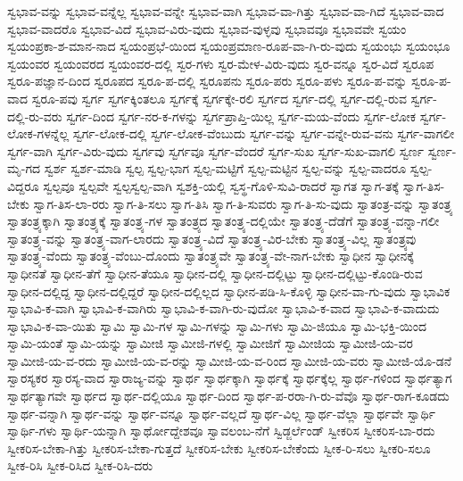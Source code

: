 {ಸ್ವಭಾವ-ವನ್ನು
ಸ್ವಭಾವ-ವನ್ನೆಲ್ಲ
ಸ್ವಭಾವ-ವನ್ನೇ
ಸ್ವಭಾವ-ವಾಗಿ
ಸ್ವಭಾವ-ವಾ-ಗಿತ್ತು
ಸ್ವಭಾವ-ವಾ-ಗಿದೆ
ಸ್ವಭಾವ-ವಾದ
ಸ್ವಭಾವ-ವಾದರೊ
ಸ್ವಭಾವ-ವಿದೆ
ಸ್ವಭಾವ-ವಿರು-ವುದು
ಸ್ವಭಾವ-ವುಳ್ಳವು
ಸ್ವಭಾವವೂ
ಸ್ವಭಾವವೇ
ಸ್ವಯಂ
ಸ್ವಯಂಪ್ರಕಾ-ಶ-ಮಾನ-ನಾದ
ಸ್ವಯಂಪ್ರಭೆ-ಯಿಂದ
ಸ್ವಯಂಪ್ರಮಾಣ-ರೂಪ-ವಾ-ಗಿ-ರು-ವುದು
ಸ್ವಯಂಭು
ಸ್ವಯಂಭೂ
ಸ್ವಯಂವರ
ಸ್ವಯಂವರದ
ಸ್ವಯಂವರ-ದಲ್ಲಿ
ಸ್ವರ-ಗಳು
ಸ್ವರ-ಮೇಳ-ವಿರು-ವುದು
ಸ್ವರ-ವನ್ನೂ
ಸ್ವರ-ವಿದೆ
ಸ್ವರೂಪ
ಸ್ವರೂ-ಪಜ್ಞಾನ-ದಿಂದ
ಸ್ವರೂಪದ
ಸ್ವರೂ-ಪ-ದಲ್ಲಿ
ಸ್ವರೂಪನು
ಸ್ವರೂ-ಪರು
ಸ್ವರೂ-ಪಳು
ಸ್ವರೂ-ಪ-ವನ್ನು
ಸ್ವರೂ-ಪ-ವಾದ
ಸ್ವರೂ-ಪವು
ಸ್ವರ್ಗ
ಸ್ವರ್ಗಕ್ಕಿಂತಲೂ
ಸ್ವರ್ಗಕ್ಕೆ
ಸ್ವರ್ಗಕ್ಕೇ-ರಲಿ
ಸ್ವರ್ಗದ
ಸ್ವರ್ಗ-ದಲ್ಲಿ
ಸ್ವರ್ಗ-ದಲ್ಲಿ-ರುವ
ಸ್ವರ್ಗ-ದಲ್ಲಿ-ರು-ವರು
ಸ್ವರ್ಗ-ದಿಂದ
ಸ್ವರ್ಗ-ನರ-ಕ-ಗಳನ್ನು
ಸ್ವರ್ಗಪ್ರಾಪ್ತಿ-ಯಿಲ್ಲ
ಸ್ವರ್ಗ-ಮಯ-ವೆಂದು
ಸ್ವರ್ಗ-ಲೋಕ
ಸ್ವರ್ಗ-ಲೋಕ-ಗಳನ್ನೆಲ್ಲ
ಸ್ವರ್ಗ-ಲೋಕ-ದಲ್ಲಿ
ಸ್ವರ್ಗ-ಲೋಕ-ವೆಂಬುದು
ಸ್ವರ್ಗ-ವನ್ನು
ಸ್ವರ್ಗ-ವನ್ನೇ-ರುವ-ವನು
ಸ್ವರ್ಗ-ವಾಗಲೀ
ಸ್ವರ್ಗ-ವಾಗಿ
ಸ್ವರ್ಗ-ವಿರು-ವುದು
ಸ್ವರ್ಗವು
ಸ್ವರ್ಗವೂ
ಸ್ವರ್ಗ-ವೆಂದರೆ
ಸ್ವರ್ಗ-ಸುಖ
ಸ್ವರ್ಗ-ಸುಖ-ವಾಗಲಿ
ಸ್ವರ್ಣ
ಸ್ವರ್ಣ-ಮೃ-ಗದ
ಸ್ವರ್ಶ
ಸ್ವರ್ಶ-ಮಾಡಿ
ಸ್ವಲ್ಪ
ಸ್ವಲ್ಪ-ಭಾಗ
ಸ್ವಲ್ಪ-ಮಟ್ಟಿಗೆ
ಸ್ವಲ್ಪ-ಮಟ್ಟಿನ
ಸ್ವಲ್ಪ-ವನ್ನು
ಸ್ವಲ್ಪ-ವಾದರೂ
ಸ್ವಲ್ಪ-ವಿದ್ದರೂ
ಸ್ವಲ್ಪವೂ
ಸ್ವಲ್ಪವೇ
ಸ್ವಲ್ಪಸ್ವಲ್ಪ-ವಾಗಿ
ಸ್ವಶಕ್ತಿ-ಯಲ್ಲಿ
ಸ್ವಸ್ಥ-ಗೊಳಿ-ಸುವಿ-ರಾದರೆ
ಸ್ವಾಗತ
ಸ್ವಾಗ-ತಕ್ಕೆ
ಸ್ವಾಗ-ತಿಸ-ಬೇಕು
ಸ್ವಾಗ-ತಿಸ-ಲಾ-ರರು
ಸ್ವಾಗ-ತಿ-ಸಲು
ಸ್ವಾಗ-ತಿಸಿ
ಸ್ವಾಗ-ತಿ-ಸುವರು
ಸ್ವಾಗ-ತಿ-ಸು-ವುದು
ಸ್ವಾತಂತ್ರ-ವನ್ನು
ಸ್ವಾತಂತ್ರ್ಯ
ಸ್ವಾತಂತ್ರ್ಯಕ್ಕಾಗಿ
ಸ್ವಾತಂತ್ರ್ಯಕ್ಕೆ
ಸ್ವಾತಂತ್ರ್ಯ-ಗಳ
ಸ್ವಾತಂತ್ರ್ಯದ
ಸ್ವಾತಂತ್ರ್ಯ-ದಲ್ಲಿಯೇ
ಸ್ವಾತಂತ್ರ್ಯ-ದೆಡೆಗೆ
ಸ್ವಾತಂತ್ರ್ಯ-ವನ್ನಾ-ಗಲೀ
ಸ್ವಾತಂತ್ರ್ಯ-ವನ್ನು
ಸ್ವಾತಂತ್ರ್ಯ-ವಾಗ-ಲಾರದು
ಸ್ವಾತಂತ್ರ್ಯ-ವಿದೆ
ಸ್ವಾತಂತ್ರ್ಯ-ವಿರ-ಬೇಕು
ಸ್ವಾತಂತ್ರ್ಯ-ವಿಲ್ಲ
ಸ್ವಾತಂತ್ರ್ಯವು
ಸ್ವಾತಂತ್ರ್ಯ-ವೆಂದು
ಸ್ವಾತಂತ್ರ್ಯ-ವೆಂಬು-ದೊಂದು
ಸ್ವಾತಂತ್ರ್ಯವೇ
ಸ್ವಾತಂತ್ರ್ಯ-ವೇ-ನಾಗ-ಬೇಕು
ಸ್ವಾಧೀನ
ಸ್ವಾಧೀನಕ್ಕೆ
ಸ್ವಾಧೀನತೆ
ಸ್ವಾಧೀನ-ತೆಗೆ
ಸ್ವಾಧೀನ-ತೆಯೂ
ಸ್ವಾಧೀನ-ದಲ್ಲಿ
ಸ್ವಾಧೀನ-ದಲ್ಲಿಟ್ಟು
ಸ್ವಾಧೀನ-ದಲ್ಲಿಟ್ಟು-ಕೊಂಡಿ-ರುವ
ಸ್ವಾಧೀನ-ದಲ್ಲಿದ್ದ
ಸ್ವಾಧೀನ-ದಲ್ಲಿದ್ದರೆ
ಸ್ವಾಧೀನ-ದಲ್ಲಿಲ್ಲದ
ಸ್ವಾಧೀನ-ಪಡಿ-ಸಿ-ಕೊಳ್ಳಿ
ಸ್ವಾಧೀನ-ವಾ-ಗು-ವುದು
ಸ್ವಾಭಾವಿಕ
ಸ್ವಾಭಾವಿ-ಕ-ವಾಗಿ
ಸ್ವಾಭಾವಿ-ಕ-ವಾಗಿರು
ಸ್ವಾಭಾವಿ-ಕ-ವಾಗಿ-ರು-ವುದೋ
ಸ್ವಾಭಾವಿ-ಕ-ವಾದ
ಸ್ವಾಭಾವಿ-ಕ-ವಾದುದು
ಸ್ವಾಭಾವಿ-ಕ-ವಾ-ಯಿತು
ಸ್ವಾಮಿ
ಸ್ವಾಮಿ-ಗಳ
ಸ್ವಾಮಿ-ಗಳನ್ನು
ಸ್ವಾಮಿ-ಗಳು
ಸ್ವಾಮಿ-ಜಿಯೂ
ಸ್ವಾಮಿ-ಭಕ್ತಿ-ಯಿಂದ
ಸ್ವಾಮಿ-ಯಂತೆ
ಸ್ವಾಮಿ-ಯನ್ನು
ಸ್ವಾಮೀಜಿ
ಸ್ವಾಮೀಜಿ-ಗಳಲ್ಲಿ
ಸ್ವಾಮೀಜಿಗೆ
ಸ್ವಾಮೀಜಿಯ
ಸ್ವಾಮೀಜಿ-ಯ-ವರ
ಸ್ವಾಮೀಜಿ-ಯ-ವ-ರದು
ಸ್ವಾಮೀಜಿ-ಯ-ವ-ರನ್ನು
ಸ್ವಾಮೀಜಿ-ಯ-ವ-ರಿಂದ
ಸ್ವಾಮೀಜಿ-ಯ-ವರು
ಸ್ವಾಮೀಜಿ-ಯೊ-ಡನೆ
ಸ್ವಾರಸ್ಯಕರ
ಸ್ವಾರಸ್ಯ-ವಾದ
ಸ್ವಾರಾಜ್ಯ-ವನ್ನು
ಸ್ವಾರ್ಥ
ಸ್ವಾರ್ಥಕ್ಕಾಗಿ
ಸ್ವಾರ್ಥಕ್ಕೆ
ಸ್ವಾರ್ಥಕ್ಕೆಲ್ಲ
ಸ್ವಾರ್ಥ-ಗಳಿಂದ
ಸ್ವಾರ್ಥತ್ಯಾಗ
ಸ್ವಾರ್ಥತ್ಯಾಗವೇ
ಸ್ವಾರ್ಥದ
ಸ್ವಾರ್ಥ-ದಲ್ಲಿಯೂ
ಸ್ವಾರ್ಥ-ದಿಂದ
ಸ್ವಾರ್ಥ-ಪ-ರರಾ-ಗಿ-ರು-ವೆವೊ
ಸ್ವಾರ್ಥ-ರಾಗ-ಕೂಡದು
ಸ್ವಾರ್ಥ-ವನ್ನಾಗಿ
ಸ್ವಾರ್ಥ-ವನ್ನು
ಸ್ವಾರ್ಥ-ವನ್ನೂ
ಸ್ವಾರ್ಥ-ವಲ್ಲದೆ
ಸ್ವಾರ್ಥ-ವಿಲ್ಲ
ಸ್ವಾರ್ಥ-ವೆಲ್ಲಾ
ಸ್ವಾರ್ಥವೇ
ಸ್ವಾರ್ಥಿ
ಸ್ವಾರ್ಥಿ-ಗಳು
ಸ್ವಾರ್ಥಿ-ಯನ್ನಾಗಿ
ಸ್ವಾರ್ಥೋದ್ದೇಶವೂ
ಸ್ವಾವಲಂಬ-ನೆಗೆ
ಸ್ವಿಡ್ಜರ್ಲೆಂಡ್
ಸ್ವೀಕರಿಸ
ಸ್ವೀಕರಿಸ-ಬಾ-ರದು
ಸ್ವೀಕರಿಸ-ಬೇಕಾ-ಗಿತ್ತು
ಸ್ವೀಕರಿಸ-ಬೇಕಾ-ಗುತ್ತದೆ
ಸ್ವೀಕರಿಸ-ಬೇಕು
ಸ್ವೀಕರಿಸ-ಬೇಕೆಂದು
ಸ್ವೀಕ-ರಿ-ಸಲು
ಸ್ವೀಕರಿ-ಸಲೂ
ಸ್ವೀಕ-ರಿಸಿ
ಸ್ವೀಕ-ರಿಸಿದ
ಸ್ವೀಕ-ರಿಸಿ-ದರು
}
